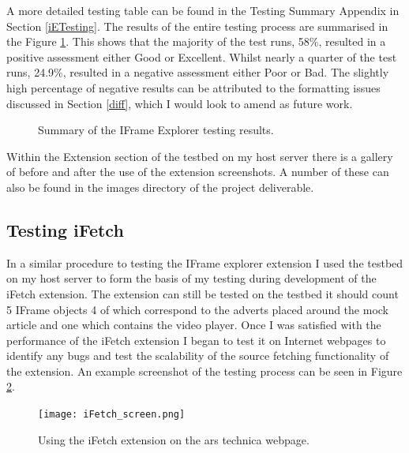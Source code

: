 \documentclass[12pt]{article}
\begin{document}
A more detailed testing table can be found in the Testing Summary Appendix in Section \ref{iETesting}. The results of the entire testing process are summarised in the Figure \ref{fig:iePie}. This shows that the majority of the test runs, 58\%, resulted in a positive assessment either Good or Excellent. Whilst nearly a quarter of the test runs, 24.9\%, resulted in a negative assessment either Poor or Bad. The slightly high percentage of negative results can be attributed to the formatting issues discussed in Section \ref{diff}, which I would look to amend as future work. 

\begin{figure} [H]
    \centering
        \caption{Summary of the IFrame Explorer testing results.}
        \label{fig:iePie}
\end{figure}


Within the Extension section of the testbed on my host server there is a gallery of before and after the use of the extension screenshots. A number of these can also be found in the images directory of the project deliverable. 

\subsection{Testing iFetch}
In a similar procedure to testing the IFrame explorer extension I used the testbed on my host server to form the basis of my testing during development of the iFetch extension. The extension can still be tested on the testbed it should count 5 IFrame objects 4 of which correspond to the adverts placed around the mock article and one which contains the video player. Once I was satisfied with the performance of the iFetch extension I began to test it on Internet webpages to identify any bugs and test the scalability of the source fetching functionality of the extension. An example screenshot of the testing process can be seen in Figure \ref{fig:iFetch_screen}.  

\begin{figure}[H]
    \centering
    \texttt{[image: iFetch\_screen.png]}
    \caption{Using the iFetch extension on the ars technica webpage.}
    \label{fig:iFetch_screen}
\end{figure}
\end{document}
